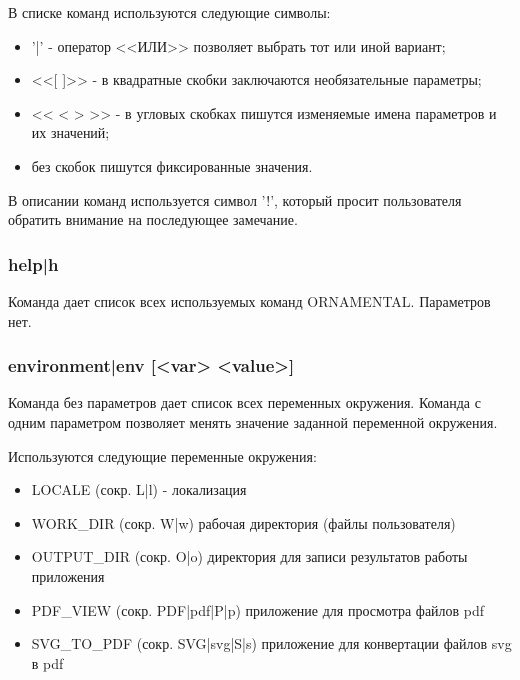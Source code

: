 \documentclass[a4paper]{article}
\begin{document}
В списке команд используются следующие символы:
\begin{itemize}
\item '|' - оператор <<ИЛИ>> позволяет выбрать тот или иной вариант;
\item <<[ ]>> - в квадратные скобки заключаются необязательные параметры; 
\item << < > >> - в угловых скобках пишутся изменяемые имена параметров и их значений;
\item без скобок пишутся фиксированные значения.
\end{itemize}
    
В описании команд используется символ '!', который просит пользователя обратить внимание на последующее замечание.

\subsubsection{help|h} 
Команда дает список всех используемых команд ORNAMENTAL. Параметров нет.

\subsubsection{environment|env [<var> <value>]}
Команда без параметров дает список всех переменных окружения. 
Команда с одним параметром позволяет менять значение заданной переменной окружения. 

Используются следующие переменные окружения:
\begin{itemize}
\item LOCALE (сокр. L|l) - локализация
\item WORK\_DIR (сокр. W|w) рабочая директория (файлы пользователя) 
\item OUTPUT\_DIR (сокр. O|o) директория для записи результатов работы приложения
\item PDF\_VIEW (сокр. PDF|pdf|P|p) приложение для просмотра файлов pdf
\item SVG\_TO\_PDF (сокр. SVG|svg|S|s) приложение для конвертации файлов svg в pdf
\end{itemize}
 
\end{document}
